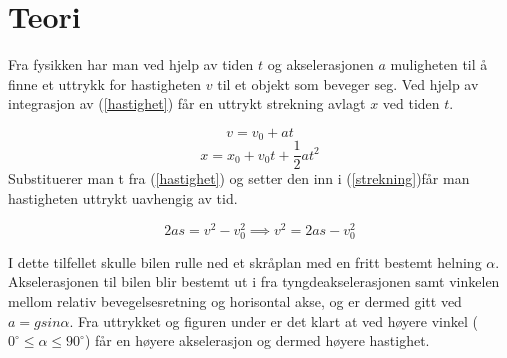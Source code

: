 \documentclass[11pt, a4paper]{report}
\begin{document}
\section{Teori}
Fra fysikken har man ved hjelp av tiden $t$ og akselerasjonen $a$ muligheten til å finne et uttrykk for hastigheten $v$ til et objekt som beveger seg. Ved hjelp av integrasjon av (\ref{hastighet}) får en uttrykt strekning avlagt $x$ ved tiden $t$.

\begin{equation} \label{hastighet}
v = v_{0} + at
\end{equation}
\begin{equation} \label{strekning}
x = x_{0} + v_{0}t + \frac{1}{2}at^{2}
\end{equation}
Substituerer man t fra (\ref{hastighet}) og setter den inn i (\ref{strekning})får man hastigheten uttrykt uavhengig av tid.

\begin{equation}
2as = v^{2}-v_{0}^{2} \implies v^{2} = 2as-v_{0}^{2}
\end{equation}
\newline

I dette tilfellet skulle bilen rulle ned et skråplan med en fritt bestemt helning $\alpha$. Akselerasjonen til bilen blir bestemt ut i fra tyngdeakselerasjonen samt vinkelen mellom relativ bevegelsesretning og horisontal akse, og er dermed gitt ved $a = gsin \alpha$. Fra uttrykket og figuren under er det klart at ved høyere vinkel ($0^\circ \leq\alpha\leq 90^\circ$) får en høyere akselerasjon og dermed høyere hastighet.\newline
\end{document}
